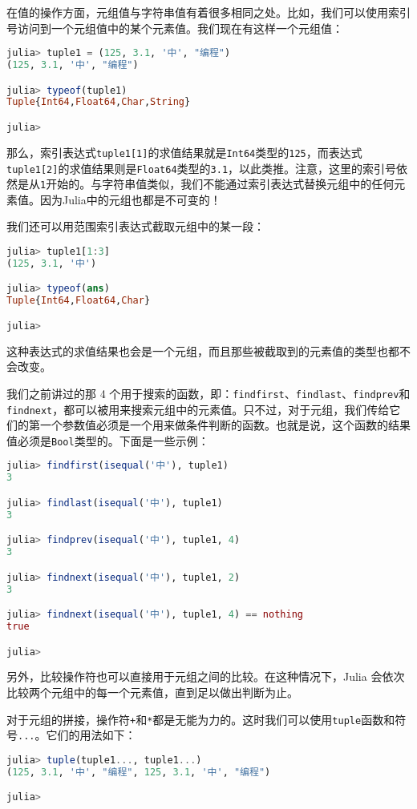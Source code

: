 在值的操作方面，元组值与字符串值有着很多相同之处。比如，我们可以使用索引号访问到一个元组值中的某个元素值。我们现在有这样一个元组值：
\begin{lstlisting}[language=julia]
julia> tuple1 = (125, 3.1, '中', "编程")
(125, 3.1, '中', "编程")

julia> typeof(tuple1)
Tuple{Int64,Float64,Char,String}

julia> 
\end{lstlisting}

那么，索引表达式\verb|tuple1[1]|的求值结果就是\verb|Int64|类型的\verb|125|，而表达式\verb|tuple1[2]|的求值结果则是\verb|Float64|类型的\verb|3.1|，以此类推。注意，这里的索引号依然是从\verb|1|开始的。与字符串值类似，我们不能通过索引表达式替换元组中的任何元素值。因为Julia中的元组也都是不可变的！

我们还可以用范围索引表达式截取元组中的某一段：
\begin{lstlisting}[language=julia]
julia> tuple1[1:3]
(125, 3.1, '中')

julia> typeof(ans)
Tuple{Int64,Float64,Char}

julia> 
\end{lstlisting}

这种表达式的求值结果也会是一个元组，而且那些被截取到的元素值的类型也都不会改变。

我们之前讲过的那 4 个用于搜索的函数，即：\verb|findfirst|、\verb|findlast|、\verb|findprev|和\verb|findnext|，都可以被用来搜索元组中的元素值。只不过，对于元组，我们传给它们的第一个参数值必须是一个用来做条件判断的函数。也就是说，这个函数的结果值必须是\verb|Bool|类型的。下面是一些示例：
\begin{lstlisting}[language=julia]
julia> findfirst(isequal('中'), tuple1)
3

julia> findlast(isequal('中'), tuple1)
3

julia> findprev(isequal('中'), tuple1, 4)
3

julia> findnext(isequal('中'), tuple1, 2)
3

julia> findnext(isequal('中'), tuple1, 4) == nothing
true

julia>  
\end{lstlisting}

另外，比较操作符也可以直接用于元组之间的比较。在这种情况下，Julia 会依次比较两个元组中的每一个元素值，直到足以做出判断为止。

对于元组的拼接，操作符\verb|+|和\verb|*|都是无能为力的。这时我们可以使用\verb|tuple|函数和符号\verb|...|。它们的用法如下：
\begin{lstlisting}[language=julia]
julia> tuple(tuple1..., tuple1...)
(125, 3.1, '中', "编程", 125, 3.1, '中', "编程")

julia> 
\end{lstlisting}

